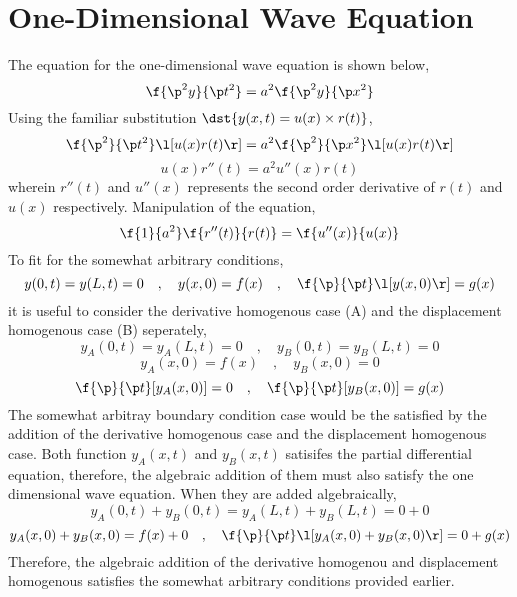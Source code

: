\chapter{One-Dimensional Wave Equation}
\begin{comment} 
Physics Archives
\end{comment}
The equation for the one-dimensional wave equation is shown below,
$$\f{\p^2 y}{\p t^2} = a^2\f{\p^2 y}{\p x^2}$$ 
Using the familiar substitution $\dst{y(x,t) = u(x)\times r(t)}$,
$$\f{\p^2}{\p t^2}\l[u(x)r(t)\r] = a^2\f{\p^2}{\p x^2}\l[u(x)r(t)\r]$$
$$u(x)r''(t) = a^2u''(x)r(t)$$ 
wherein $r''(t)$ and $u''(x)$ represents the second order derivative of $r(t)$ and $u(x)$ respectively. Manipulation of the equation,
$$\f{1}{a^2}\f{r''(t)}{r(t)} = \f{u''(x)}{u(x)}$$
To fit for the somewhat arbitrary conditions,
$$y(0,t) = y(L,t) = 0\quad,\quad y(x,0) = f(x) \quad,\quad \f{\p}{\p t}\l[y(x,0)\r] = g(x)$$
it is useful to consider the derivative homogenous case (A) and the displacement homogenous case (B) seperately,
$$y_A(0,t) = y_A(L,t) = 0\quad,\quad y_B(0,t) = y_B(L,t) = 0$$
$$y_A(x,0) = f(x)\quad,\quad y_B(x,0) = 0$$
$$\f{\p }{\p t}[y_A(x,0)] = 0\quad,\quad \f{\p }{\p t}[y_B(x,0)] = g(x)$$
The somewhat arbitray boundary condition case would be the satisfied by the  addition of the derivative homogenous case  and the displacement homogenous case. Both function $y_A(x,t)$ and $y_B(x,t)$ satisifes the partial differential equation, therefore, the algebraic addition of them must also satisfy the one dimensional wave equation. When they are added algebraically,
$$y_A(0,t) + y_B(0,t) = y_A(L,t) + y_B(L,t) = 0 + 0$$
$$y_A(x,0) + y_B(x,0) = f(x) + 0\quad,\quad \f{\p}{\p t}\l[y_A(x,0) + y_B(x,0)\r] = 0 + g(x)$$
Therefore, the algebraic addition of the derivative homogenou and displacement homogenous satisfies the somewhat arbitrary conditions provided earlier.

